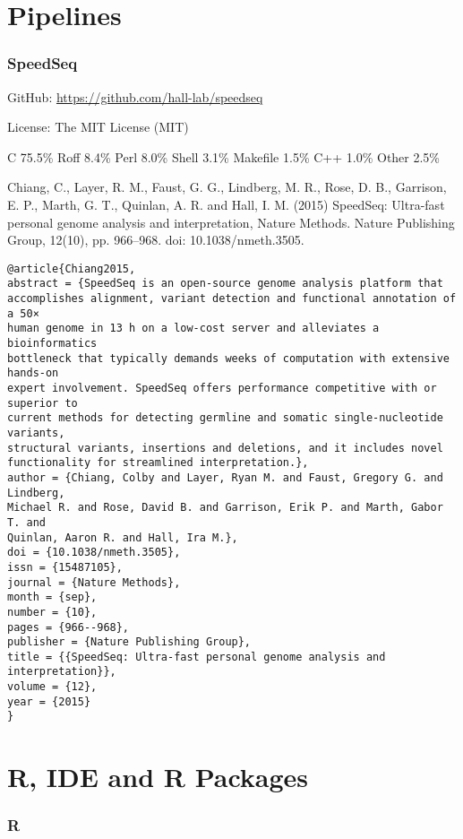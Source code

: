 \documentclass[]{article}
\begin{document}
\part{Pipelines}
\section{SpeedSeq}

GitHub: \url{https://github.com/hall-lab/speedseq}

License: The MIT License (MIT)

C 75.5\% Roff 8.4\% Perl 8.0\% Shell 3.1\% Makefile 1.5\% C++ 1.0\% Other 2.5\%



Chiang, C., Layer, R. M., Faust, G. G., Lindberg, M. R., Rose, D. B., Garrison, E. P., Marth, G. T., Quinlan, A. R. and Hall, I. M. (2015) SpeedSeq: Ultra-fast personal genome analysis and interpretation, Nature Methods. Nature Publishing Group, 12(10), pp. 966–968. doi: 10.1038/nmeth.3505.

\begin{verbatim}
@article{Chiang2015,
abstract = {SpeedSeq is an open-source genome analysis platform that
accomplishes alignment, variant detection and functional annotation of a 50×
human genome in 13 h on a low-cost server and alleviates a bioinformatics
bottleneck that typically demands weeks of computation with extensive hands-on
expert involvement. SpeedSeq offers performance competitive with or superior to
current methods for detecting germline and somatic single-nucleotide variants,
structural variants, insertions and deletions, and it includes novel
functionality for streamlined interpretation.},
author = {Chiang, Colby and Layer, Ryan M. and Faust, Gregory G. and Lindberg,
Michael R. and Rose, David B. and Garrison, Erik P. and Marth, Gabor T. and
Quinlan, Aaron R. and Hall, Ira M.},
doi = {10.1038/nmeth.3505},
issn = {15487105},
journal = {Nature Methods},
month = {sep},
number = {10},
pages = {966--968},
publisher = {Nature Publishing Group},
title = {{SpeedSeq: Ultra-fast personal genome analysis and interpretation}},
volume = {12},
year = {2015}
}
\end{verbatim}

\part{R, IDE and R Packages}

\section{R}
\end{document}
